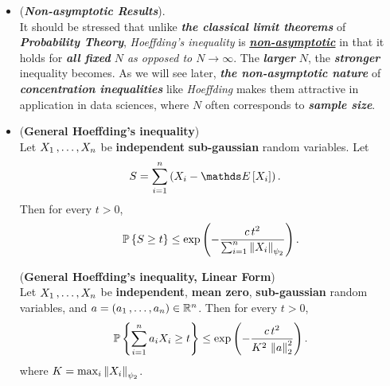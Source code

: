 \documentclass[11pt]{article}
\begin{document}
\begin{itemize}
\item \begin{remark} (\textbf{\emph{Non-asymptotic Results}}). \citep{vershynin2018high}\\
 It should be stressed that unlike \emph{\textbf{the classical limit theorems}} of \emph{\textbf{Probability Theory}}, \emph{Hoeffding's inequality} is \underline{\emph{\textbf{non-asymptotic}}} in that it holds for \emph{\textbf{all fixed} $N$ as opposed to $N \to \infty$}. The \emph{\textbf{larger}} $N$, the \emph{\textbf{stronger}} inequality becomes. As we will see later, \emph{\textbf{the non-asymptotic nature}} of \emph{\textbf{concentration inequalities}} like \emph{Hoeffding} makes them attractive in application  in data sciences, where $N$ often corresponds to \emph{\textbf{sample size}}.
\end{remark}

\item 
 \begin{proposition} (\textbf{General Hoeffding's inequality}) \citep{vershynin2018high} \\
Let $X_1 \,{,}\ldots{,}\, X_n$ be \textbf{independent} \textbf{sub-gaussian} random variables. Let
\begin{align*}
S &= \sum_{i=1}^{n}\paren{X_i - \E{}{X_i}}.
\end{align*}
Then for every $t > 0$,
\begin{align}
{\mathbb P}\left\{S \ge  t\right\}  \le \exp\left(- \frac{c\,t^2}{\sum_{i=1}^{n}\left\|X_i\right\|_{\psi_2}}\right). \label{ineqn: general_hoeffding_inequality}
\end{align}
\end{proposition}

 \begin{proposition} (\textbf{General Hoeffding's inequality, Linear Form}) \citep{vershynin2018high} \\
Let $X_1 \,{,}\ldots{,}\, X_n$ be \textbf{independent}, \textbf{mean zero}, \textbf{sub-gaussian} random variables, and $a = (a_1 \,{,}\ldots{,}\, a_n) \in {\mathbb R}^{n}$.   Then for every $t > 0$,
\begin{align}
{\mathbb P}\left\{\sum_{i=1}^{n}a_i X_i \ge  t\right\} \le \exp\left(- \frac{c\,t^2}{K^2\,\left\|a\right\|_{2}^2}\right). \label{ineqn: general_hoeffding_inequality_2}
\end{align} where $K = \max_i \left\|X_i\right\|_{\psi_2}$.
\end{proposition}


\end{itemize}
\end{document}
